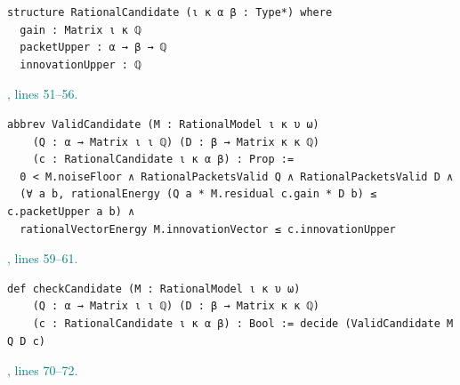 \documentclass[11pt]{article}\usepackage{needspace}\renewcommand{\paperkind}{Lean companion}\setlength{\parskip}{0.35em}
\begin{document}
\begin{lstlisting}[style=BayesSource]
structure RationalCandidate (ι κ α β : Type*) where
  gain : Matrix ι κ ℚ
  packetUpper : α → β → ℚ
  innovationUpper : ℚ
\end{lstlisting}



{\small\textcolor{teal}{, lines 51--56.}\par}

\begin{lstlisting}[style=BayesSource]
abbrev ValidCandidate (M : RationalModel ι κ υ ω)
    (Q : α → Matrix ι ι ℚ) (D : β → Matrix κ κ ℚ)
    (c : RationalCandidate ι κ α β) : Prop :=
  0 < M.noiseFloor ∧ RationalPacketsValid Q ∧ RationalPacketsValid D ∧
  (∀ a b, rationalEnergy (Q a * M.residual c.gain * D b) ≤ c.packetUpper a b) ∧
  rationalVectorEnergy M.innovationVector ≤ c.innovationUpper
\end{lstlisting}



{\small\textcolor{teal}{, lines 59--61.}\par}

\begin{lstlisting}[style=BayesSource]
def checkCandidate (M : RationalModel ι κ υ ω)
    (Q : α → Matrix ι ι ℚ) (D : β → Matrix κ κ ℚ)
    (c : RationalCandidate ι κ α β) : Bool := decide (ValidCandidate M Q D c)
\end{lstlisting}



{\small\textcolor{teal}{, lines 70--72.}\par}
\end{document}
